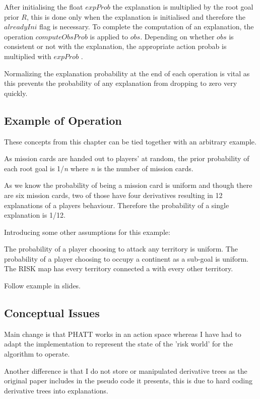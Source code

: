 \documentclass[parskip]{cs4rep}
\begin{document}
After initialising the float $expProb$ the explanation is multiplied by the root goal prior $R$, this is done only when the explanation is initialised and therefore the $alreadyIni$ flag is necessary. To complete the computation of an explanation, the operation $computeObsProb$ is applied to $obs$. Depending on whether $obs$ is consistent or not with the explanation, the appropriate action probab is multiplied with $expProb$ .

Normalizing the explanation probability at the end of each operation is vital as this prevents the probability of any explanation from dropping to zero very quickly. 

\subsection{Example of Operation}

These concepts from this chapter can be tied together with an arbitrary example.

As mission cards are handed out to players' at random, the prior probability of each root goal is 1/\textit{n} where \textit{n} is the number of mission cards.

As we know the probability of being a mission card is uniform and though there are six mission cards, two of those have four derivatives resulting in 12 explanations of a players behaviour. Therefore the probability of a single explanation is 1/12.

Introducing some other assumptions for this example:

The probability of a player choosing to attack any territory is uniform.
The probability of a player choosing to occupy a continent as a sub-goal is uniform.
The RISK map has every territory connected a with every other territory.

Follow example in slides.

\subsection{Conceptual Issues}

Main change is that PHATT works in an action space whereas I have had to adapt the implementation to represent the state of the 'risk world' for the algorithm to operate.

Another difference is that I do not store or manipulated derivative trees as the original paper includes in the pseudo code it presents, this is due to hard coding derivative trees into explanations.
\end{document}
